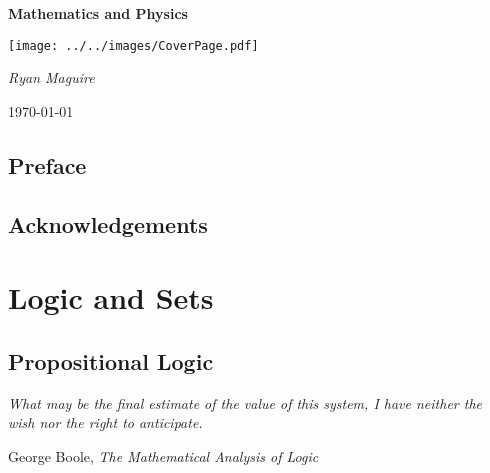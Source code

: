 \documentclass{book}                                                           %
\begin{document}
    \pagecolor{CoverPage}
    \begin{titlepage}
        \centering
        \LARGE{\bfseries{Mathematics and Physics}}
        \par\vspace{3.5cm}
        \texttt{[image: ../../images/CoverPage.pdf]}
        \par\vspace{4cm}
        \Large{\itshape{Ryan Maguire}}
        \par\vspace{1.5ex}
        \normalsize{\today}
    \end{titlepage}
    \nopagecolor
    \tableofcontents
    \listoffigures
    \listoftables
    \clearpage
    \chapter*{Preface}
        
    \clearpage
    \chapter*{Acknowledgements}
        
    \clearpage
        \renewcommand{\TOPPATH}{books/foundations}
        \label{book:Foundations}%
        \renewcommand{\PARPATH}{\TOPPATH/Logic_and_Sets}
        \part{Logic and Sets}
            \chapter{Propositional Logic}
                \hfill
                \begin{minipage}[b]{0.7\textwidth}
                    \itshape
                    What may be the final estimate of the value of this
                    system, I have neither the wish nor the right to
                    anticipate.
                    \par\hfill\par
                    \hfill
                    \normalfont
                    George Boole,
                    \itshape
                    The Mathematical Analysis of Logic
                \end{minipage}
                \par\hfill\par
                \renewcommand{\PATH}{\PARPATH/Propositional_Logic}
                \label{chapt:Propositional_Logic}%
                
                
\end{document}
